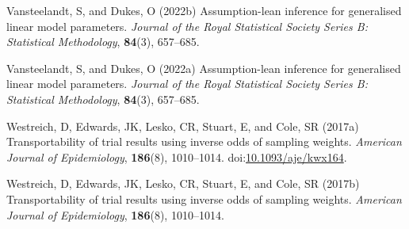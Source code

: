 \documentclass[
  single column]{article}
\newlength{\cslhangindent}
\newenvironment{CSLReferences}[2] %
 {\begin{list}{}{%
  \setlength{\itemindent}{0pt}
  \setlength{\leftmargin}{0pt}
  \setlength{\parsep}{0pt}
  \ifodd #1
   \setlength{\leftmargin}{\cslhangindent}
   \setlength{\itemindent}{-1\cslhangindent}
  \fi
  \setlength{\itemsep}{#2\baselineskip}}}
 {\end{list}}
\begin{document}
\begin{CSLReferences}{1}{0}
Vansteelandt, S, and Dukes, O (2022b) Assumption-lean inference for
generalised linear model parameters. \emph{Journal of the Royal
Statistical Society Series B: Statistical Methodology}, \textbf{84}(3),
657--685.

Vansteelandt, S, and Dukes, O (2022a) Assumption-lean inference for
generalised linear model parameters. \emph{Journal of the Royal
Statistical Society Series B: Statistical Methodology}, \textbf{84}(3),
657--685.

Westreich, D, Edwards, JK, Lesko, CR, Stuart, E, and Cole, SR (2017a)
Transportability of trial results using inverse odds of sampling
weights. \emph{American Journal of Epidemiology}, \textbf{186}(8),
1010--1014.
doi:\href{https://doi.org/10.1093/aje/kwx164}{10.1093/aje/kwx164}.

Westreich, D, Edwards, JK, Lesko, CR, Stuart, E, and Cole, SR (2017b)
Transportability of trial results using inverse odds of sampling
weights. \emph{American Journal of Epidemiology}, \textbf{186}(8),
1010--1014.

\end{CSLReferences}
\end{document}
